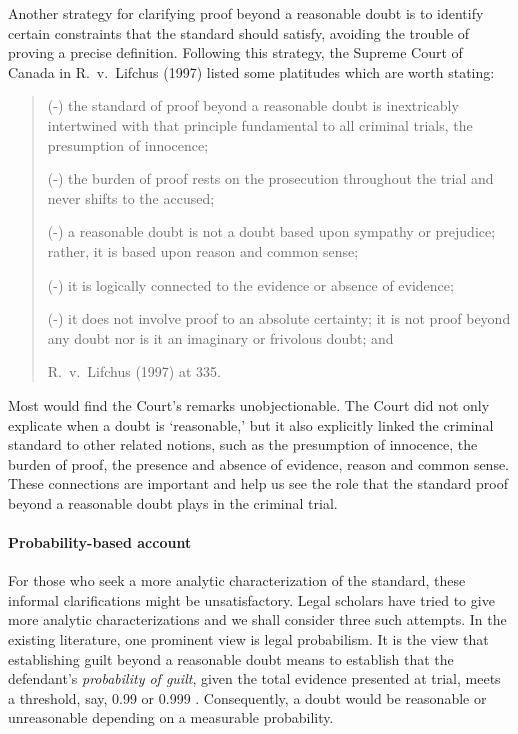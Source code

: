 \documentclass[10pt]{article}
\begin{document}

Another strategy for clarifying proof beyond a reasonable doubt is to identify 
certain constraints that the standard should satisfy, avoiding the trouble 
of proving a precise definition. Following this strategy, the Supreme Court of Canada in R.\ v.\ Lifchus (1997) 
listed some platitudes which are worth stating:

\begin{quote}
(-) the standard of proof beyond a reasonable 
doubt is inextricably intertwined with that  
principle fundamental to all criminal trials, 
the presumption of innocence;

(-) the burden of proof rests on the prosecution 
throughout the trial and never shifts to the
accused; 

(-) a reasonable doubt is not a doubt based upon 
sympathy or prejudice; 
rather, it is based upon reason and common sense;

(-) it is logically connected to the evidence or  
absence of evidence; 
 
(-) it does not involve proof to an absolute certainty; it is not proof beyond any doubt nor is 
it an imaginary or frivolous doubt;  and

R.\ v.\ Lifchus (1997) at 335.
\end{quote}

\noindent
Most would find the Court's remarks unobjectionable. The  Court did not only explicate when a doubt is `reasonable,' 
but it also explicitly linked the criminal standard to other related notions, such as the presumption of innocence, the burden of proof, the presence and absence of evidence, 
reason and common sense. These connections are important and help us see the role that the standard proof beyond a reasonable doubt plays in the criminal trial. 


\paragraph{Probability-based account}

For those who seek a more analytic characterization of the standard, 
these informal clarifications might be unsatisfactory. Legal scholars have tried to give more analytic characterizations 
and we shall consider three such attempts.  In the existing literature, one prominent view is legal probabilism. It is the view that establishing guilt beyond a reasonable doubt means to establish that the defendant's \textit{probability of guilt}, given the total evidence presented at trial, meets a threshold, say, 0.99 or 0.999  \citep{Kaplan1968Decision, Kaye1999Clarifying-the-, Tillers2007}. Consequently, a doubt would be reasonable or unreasonable depending on a measurable probability.  
\end{document}
